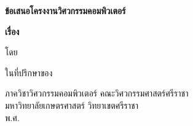 \begin{center}
{\fontsize{30pt}{32pt}\selectfont\bfseries ข้อเสนอโครงงานวิศวกรรมคอมพิวเตอร์}

{\bfseries
เรื่อง


\vfill
โดย


\vfill
ในที่ปรึกษาของ


ภาควิชาวิศวกรรมคอมพิวเตอร์ คณะวิศวกรรมศาสตร์ศรีราชา\\
มหาวิทยาลัยเกษตรศาสตร์ วิทยาเขตศรีราชา\\
พ.ศ. \thisYear
}
\end{center}
